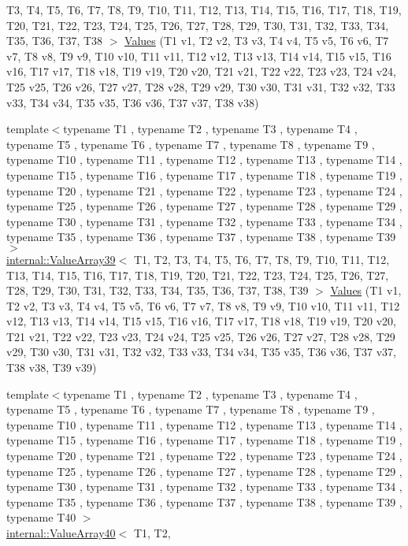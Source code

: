\begin{DoxyCompactItemize}
\-T3, \-T4, \-T5, \-T6, \-T7, \-T8, \-T9, \*
\-T10, \-T11, \-T12, \-T13, \-T14, \-T15, \*
\-T16, \-T17, \-T18, \-T19, \-T20, \-T21, \*
\-T22, \-T23, \-T24, \-T25, \-T26, \-T27, \*
\-T28, \-T29, \-T30, \-T31, \-T32, \-T33, \*
\-T34, \-T35, \-T36, \-T37, \-T38 $>$ \hyperlink{namespacetesting_aabc33ee31d17eb0b0bed3401d62266d9}{\-Values} (\-T1 v1, \-T2 v2, \-T3 v3, \-T4 v4, \-T5 v5, \-T6 v6, \-T7 v7, \-T8 v8, \-T9 v9, \-T10 v10, \-T11 v11, \-T12 v12, \-T13 v13, \-T14 v14, \-T15 v15, \-T16 v16, \-T17 v17, \-T18 v18, \-T19 v19, \-T20 v20, \-T21 v21, \-T22 v22, \-T23 v23, \-T24 v24, \-T25 v25, \-T26 v26, \-T27 v27, \-T28 v28, \-T29 v29, \-T30 v30, \-T31 v31, \-T32 v32, \-T33 v33, \-T34 v34, \-T35 v35, \-T36 v36, \-T37 v37, \-T38 v38)
\item 
{\footnotesize template$<$typename T1 , typename T2 , typename T3 , typename T4 , typename T5 , typename T6 , typename T7 , typename T8 , typename T9 , typename T10 , typename T11 , typename T12 , typename T13 , typename T14 , typename T15 , typename T16 , typename T17 , typename T18 , typename T19 , typename T20 , typename T21 , typename T22 , typename T23 , typename T24 , typename T25 , typename T26 , typename T27 , typename T28 , typename T29 , typename T30 , typename T31 , typename T32 , typename T33 , typename T34 , typename T35 , typename T36 , typename T37 , typename T38 , typename T39 $>$ }\\\hyperlink{classtesting_1_1internal_1_1ValueArray39}{internal\-::\-Value\-Array39}$<$ \-T1, \-T2, \*
\-T3, \-T4, \-T5, \-T6, \-T7, \-T8, \-T9, \*
\-T10, \-T11, \-T12, \-T13, \-T14, \-T15, \*
\-T16, \-T17, \-T18, \-T19, \-T20, \-T21, \*
\-T22, \-T23, \-T24, \-T25, \-T26, \-T27, \*
\-T28, \-T29, \-T30, \-T31, \-T32, \-T33, \*
\-T34, \-T35, \-T36, \-T37, \-T38, \-T39 $>$ \hyperlink{namespacetesting_aba3a6a2dcb9660c6ccb1d867c7a137ee}{\-Values} (\-T1 v1, \-T2 v2, \-T3 v3, \-T4 v4, \-T5 v5, \-T6 v6, \-T7 v7, \-T8 v8, \-T9 v9, \-T10 v10, \-T11 v11, \-T12 v12, \-T13 v13, \-T14 v14, \-T15 v15, \-T16 v16, \-T17 v17, \-T18 v18, \-T19 v19, \-T20 v20, \-T21 v21, \-T22 v22, \-T23 v23, \-T24 v24, \-T25 v25, \-T26 v26, \-T27 v27, \-T28 v28, \-T29 v29, \-T30 v30, \-T31 v31, \-T32 v32, \-T33 v33, \-T34 v34, \-T35 v35, \-T36 v36, \-T37 v37, \-T38 v38, \-T39 v39)
\item 
{\footnotesize template$<$typename T1 , typename T2 , typename T3 , typename T4 , typename T5 , typename T6 , typename T7 , typename T8 , typename T9 , typename T10 , typename T11 , typename T12 , typename T13 , typename T14 , typename T15 , typename T16 , typename T17 , typename T18 , typename T19 , typename T20 , typename T21 , typename T22 , typename T23 , typename T24 , typename T25 , typename T26 , typename T27 , typename T28 , typename T29 , typename T30 , typename T31 , typename T32 , typename T33 , typename T34 , typename T35 , typename T36 , typename T37 , typename T38 , typename T39 , typename T40 $>$ }\\\hyperlink{classtesting_1_1internal_1_1ValueArray40}{internal\-::\-Value\-Array40}$<$ \-T1, \-T2, \*

\end{DoxyCompactItemize}
